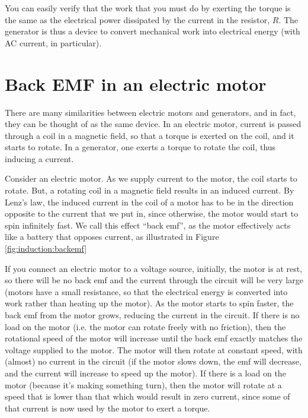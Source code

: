 You can easily verify that the work that you must do by exerting the torque is the same as the electrical power dissipated by the current in the resistor, $R$. The generator is thus a device to convert mechanical work into electrical energy (with AC current, in particular). 

\section{Back EMF in an electric motor}
There are many similarities between electric motors and generators, and in fact, they can be thought of as the same device. In an electric motor, current is passed through a coil in a magnetic field, so that a torque is exerted on the coil, and it starts to rotate. In a generator, one exerts a torque to rotate the coil, thus inducing a current. 

Consider an electric motor. As we supply current to the motor, the coil starts to rotate. But, a rotating coil in a magnetic field results in an induced current. By Lenz's law, the induced current in the coil of a motor has to be in the direction opposite to the current that we put in, since otherwise, the motor would start to spin infinitely fast. We call this effect ``back emf'', as the motor effectively acts like a battery that opposes current, as illustrated in Figure \ref{fig:induction:backemf}


If you connect an electric motor to a voltage source, initially, the motor is at rest, so there will be no back emf and the current through the circuit will be very large (motors have a small resistance, so that the electrical energy is converted into work rather than heating up the motor). As the motor starts to spin faster, the back emf from the motor grows, reducing the current in the circuit. If there is no load on the motor (i.e. the motor can rotate freely with no friction), then the rotational speed of the motor will increase until the back emf exactly matches the voltage supplied to the motor. The motor will then rotate at constant speed, with (almost) no current in the circuit (if the motor slows down, the emf will decrease, and the current will increase to speed up the motor). If there is a load on the motor (because it's making something turn), then the motor will rotate at a speed that is lower than that which would result in zero current, since some of that current is now used by the motor to exert a torque.

